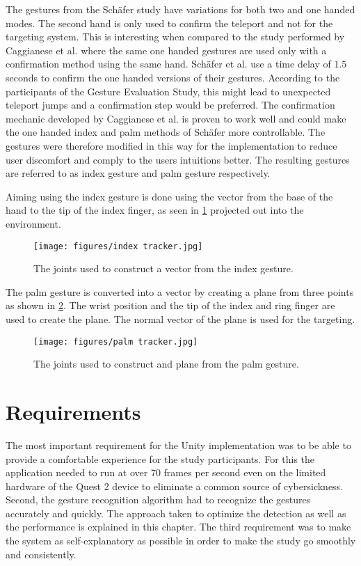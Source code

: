 The gestures from the Schäfer study have variations for both two and one handed modes. The second hand is only used to confirm the teleport and not for the targeting system. 
This is interesting when compared to the study performed by Caggianese et al. \cite{Caggianese} where the same one handed gestures are used only with a confirmation method using the same hand. Schäfer et al. use a time delay of $1.5$ seconds to confirm the one handed versions of their gestures. According to the participants of the Gesture Evaluation Study, this might lead to unexpected teleport jumps and a confirmation step would be preferred. The confirmation mechanic developed by Caggianese et al. is proven to work well and could make the one handed index and palm methods of Schäfer more controllable. The gestures were therefore modified in this way for the implementation to reduce user discomfort and comply to the users intuitions better. The resulting gestures are referred to as index gesture and palm gesture respectively. 

Aiming using the index gesture is done using the vector from the base of the hand to the tip of the index finger, as seen in \ref{fig:indexTracker} projected out into the environment. 

\begin{figure}[!ht]
    \centering
    \texttt{[image: figures/index tracker.jpg]}
    \caption{The joints used to construct a vector from the index gesture.}
    \label{fig:indexTracker}
\end{figure}

The palm gesture is converted into a vector by creating a plane from three points as shown in \ref{fig:palmTracker}. The wrist position and the tip of the index and ring finger are used to create the plane. The normal vector of the plane is used for the targeting.
\begin{figure}[!ht]
    \centering
    \texttt{[image: figures/palm tracker.jpg]}
    \caption{The joints used to construct and plane from the palm gesture.}
    \label{fig:palmTracker}
\end{figure}

\section{Requirements}
The most important requirement for the Unity implementation was to be able to provide a comfortable experience for the study participants. For this the application needed to run at over 70 frames per second even on the limited hardware of the Quest 2 device to eliminate a common source of cybersickness. Second, the gesture recognition algorithm had to recognize the gestures accurately and quickly. The approach taken to optimize the detection as well as the performance is explained in this chapter. The third requirement was to make the system as self-explanatory as possible in order to make the study go smoothly and consistently. 

